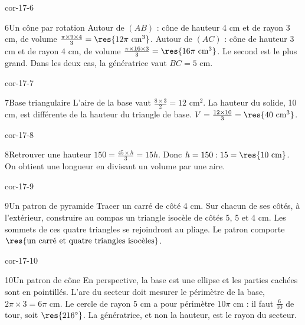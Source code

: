 \begin{blocLivre}{cor-17-6}\begin{corrige}{6}{Un cône par rotation}
Autour de $(AB)$ : cône de hauteur 4 cm et de rayon 3 cm, de volume $\frac{\pi\times9\times4}3=\res{12\pi\ \mathrm{cm}^3}$. Autour de $(AC)$ : cône de hauteur 3 cm et de rayon 4 cm, de volume $\frac{\pi\times16\times3}3=\res{16\pi\ \mathrm{cm}^3}$. Le second est le plus grand. Dans les deux cas, la génératrice vaut $BC=5$ cm.
\label{fig-cor-17-6}
\end{corrige}\end{blocLivre}
\begin{blocLivre}{cor-17-7}\begin{corrige}{7}{Base triangulaire}
L’aire de la base vaut $\frac{8\times3}2=12$ cm$^2$. La hauteur du solide, 10 cm, est différente de la hauteur du triangle de base. $V=\frac{12\times10}3=\res{40\ \mathrm{cm}^3}$.
\label{fig-cor-17-7}
\end{corrige}\end{blocLivre}
\begin{blocLivre}{cor-17-8}\begin{corrige}{8}{Retrouver une hauteur}
$150=\frac{45\times h}3=15h$. Donc $h=150:15=\res{10\ \mathrm{cm}}$. On obtient une longueur en divisant un volume par une aire.
\label{fig-cor-17-8}
\end{corrige}\end{blocLivre}
\begin{blocLivre}{cor-17-9}\begin{corrige}{9}{Un patron de pyramide}
Tracer un carré de côté 4 cm. Sur chacun de ses côtés, à l’extérieur, construire au compas un triangle isocèle de côtés 5, 5 et 4 cm. Les sommets de ces quatre triangles se rejoindront au pliage. Le patron comporte $\res{\text{un carré et quatre triangles isocèles}}$.
\label{fig-cor-17-9}
\end{corrige}\end{blocLivre}
\begin{blocLivre}{cor-17-10}\begin{corrige}{10}{Un patron de cône}
En perspective, la base est une ellipse et les parties cachées sont en pointillés. L’arc du secteur doit mesurer le périmètre de la base, $2\pi\times3=6\pi$ cm. Le cercle de rayon 5 cm a pour périmètre $10\pi$ cm : il faut $\frac6{10}$ de tour, soit $\res{216^\circ}$. La génératrice, et non la hauteur, est le rayon du secteur.
\label{fig-cor-17-10}
\end{corrige}\end{blocLivre}
